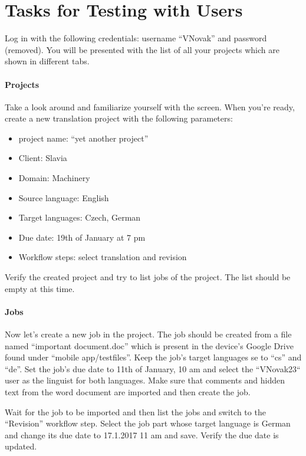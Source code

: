 \chapter{Tasks for Testing with Users}
\label{chap:walkthrough}

Log in with the following credentials: username “VNovak” and password (removed). You will be presented with the list of all your projects which are shown in different tabs.

\subsubsection{Projects}

Take a look around and familiarize yourself with the screen. When you’re ready, create a new translation project with the following parameters: 

\begin{itemize}
\item project name: “yet another project”
\item Client: Slavia
\item Domain: Machinery
\item Source language: English 
\item Target languages: Czech, German
\item Due date: 19th of January at 7 pm
\item Workflow steps: select translation and revision
\end{itemize}


Verify the created project and try to list jobs of the project. The list should be empty at this time. 


\subsubsection{Jobs}

Now let’s create a new job in the project. The job should be created from a file named “important document.doc” which is present in the device's Google Drive found under “mobile app/testfiles”. 
Keep the job’s target languages se to “cs” and “de”.
Set the job’s due date to 11th of January, 10 am and select the “VNovak23“ user as the linguist for both languages. 
Make sure that comments and hidden text from the word document are imported and then create the job. 

Wait for the job to be imported and then list the jobs and switch to the “Revision” workflow step. Select the job part whose target language is German and change its due date to 17.1.2017 11 am and save. Verify the due date is updated.

